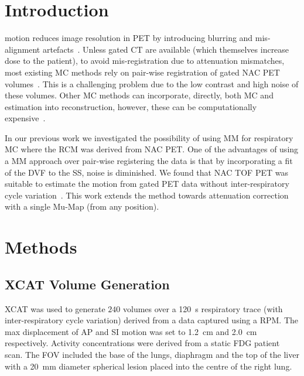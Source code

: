 \section{Introduction} \label{sec:introduction}
     motion reduces image resolution in \gls{PET} by introducing blurring and mis-alignment artefacts~\cite{Nehmeh2008a}. Unless gated \gls{CT} are available (which themselves increase dose to the patient), to avoid mis-registration due to attenuation mismatches, most existing \gls{MC} methods rely on pair-wise registration of gated \gls{NAC} \gls{PET} volumes~\cite{LungMotionDiaphragmBaiBib}.%
    This is a challenging problem due to the low contrast and high noise of these volumes. Other \gls{MC} methods can incorporate, directly, both \gls{MC} and  estimation into reconstruction, however, these can be computationally expensive~\cite{Bousse2016b}.
    
    In our previous work we investigated the possibility of using \gls{MM} for respiratory \gls{MC} where the \gls{RCM} was derived from \gls{NAC} \gls{PET}. One of the advantages of using a \gls{MM} approach over pair-wise registering the data is that by incorporating a fit of the \gls{DVF} to the \gls{SS}, noise is diminished. We found that \gls{NAC} \gls{TOF} \gls{PET} was suitable to estimate the motion from gated PET data without inter-respiratory cycle variation~\cite{Whitehead2019ImpactPET}. This work extends the method towards attenuation correction with a single \gls{Mu-Map} (from any position).

\vspace{-0.5cm}

\section{Methods} \label{sec:methods}
    \subsection{XCAT Volume Generation} \label{sec:xcat_volume_generation}
        \gls{XCAT}%
        was used to generate $240$ volumes over a \SI{120}{\second} respiratory trace (with inter-respiratory cycle variation) derived from a data captured using a \gls{RPM}. The max displacement of \gls{AP} and \gls{SI} motion was set to \SI{1.2}{\centi\metre} and \SI{2.0}{\centi\metre} respectively. Activity concentrations were derived from a static \gls{FDG} patient scan. The \gls{FOV} included the base of the lungs, diaphragm and the top of the liver with a \SI{20}{\milli\metre} diameter spherical lesion placed into the centre of the right lung.
    
